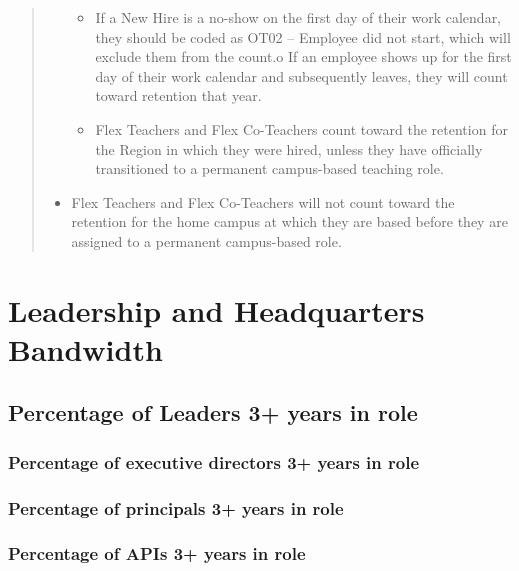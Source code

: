 \documentclass[
  letterpaper,
  DIV=11,
  numbers=noendperiod]{scrreprt}
\providecommand{\tightlist}{%
  \setlength{\itemsep}{0pt}\setlength{\parskip}{0pt}}
\begin{document}
\begin{quote}
\begin{itemize}
  \begin{itemize}
  \tightlist
  \item
    If a New Hire is a no-show on the first day of their work calendar,
    they should be coded as OT02 -- Employee did not start, which will
    exclude them from the count.o If an employee shows up for the first
    day of their work calendar and subsequently leaves, they will count
    toward retention that year.
  \item
    Flex Teachers and Flex Co-Teachers count toward the retention for
    the Region in which they were hired, unless they have officially
    transitioned to a permanent campus-based teaching role.
  \end{itemize}
\item
  Flex Teachers and Flex Co-Teachers will not count toward the retention
  for the home campus at which they are based before they are assigned
  to a permanent campus-based role.
\end{itemize}
\end{quote}


\chapter{Leadership and Headquarters Bandwidth}\label{sec-05HQBand}

\section{Percentage of Leaders 3+ years in role}\label{sec-05Leaders}

\subsection{Percentage of executive directors 3+ years in
role}\label{percentage-of-executive-directors-3-years-in-role}

\subsection{Percentage of principals 3+ years in
role}\label{percentage-of-principals-3-years-in-role}

\subsection{Percentage of APIs 3+ years in
role}\label{percentage-of-apis-3-years-in-role}
\end{document}
